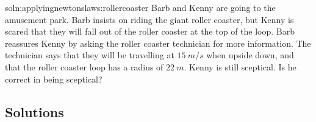 \begin{problem}{soln:applyingnewtonslaws:rollercoaster}{\label{prob:applyingnewtonslaws:rollercoaster} Barb and Kenny are going to the amusement park. Barb insists on riding the giant roller coaster, but Kenny is scared that they will fall out of the roller coaster at the top of the loop. Barb reassures Kenny by asking the roller coaster technician for more information. The technician says that they will be travelling at $\SI{15}{m/s}$ when upside down, and that the roller coaster loop has a radius of $\SI{22}{m}$. Kenny is still sceptical. Is he correct in being sceptical?}
\end{problem}

\newpage
\subsection{Solutions}
